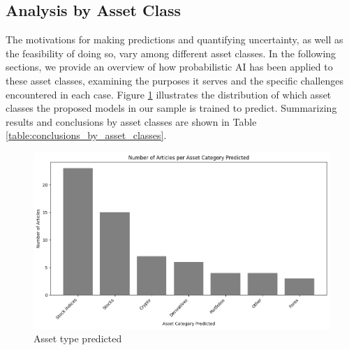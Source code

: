 
\subsection{Analysis by Asset Class}
The motivations for making predictions and quantifying uncertainty, as well as the feasibility of doing so, vary among different asset classes. In the following sections, we provide an overview of how probabilistic AI has been applied to these asset classes, examining the purposes it serves and the specific challenges encountered in each case. Figure \ref{fig:asset_type_predicted} illustrates the distribution of which asset classes the proposed models in our sample is trained to predict. Summarizing results and conclusions by asset classes are shown in Table \ref{table:conclusions_by_asset_classes}.

\begin{figure}[H]
    \centering
    \includegraphics[width=1\linewidth]{Images/articles_per_asset_type_predicted.png}
    \caption{Asset type predicted}
    \label{fig:asset_type_predicted}
\end{figure}
\makeatletter




